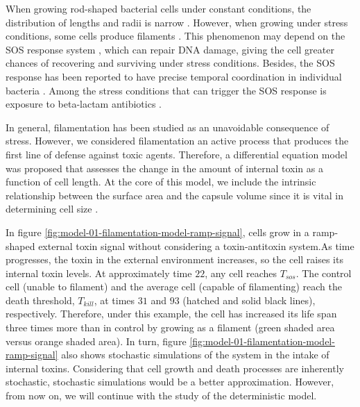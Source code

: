 \documentclass[
  12pt,
  a4paper,
  oneside]{krantz}
\begin{document}
When growing rod-shaped bacterial cells under constant conditions, the
distribution of lengths and radii is narrow
\citep{schaechterGrowthCellNuclear1962}. However, when growing under stress
conditions, some cells produce filaments
\citep{schaechterDependencyMediumTemperature1958}. This phenomenon may depend
on the SOS response system \citep{bosEmergenceAntibioticResistance2015},
which can repair DNA damage, giving the cell greater chances of
recovering and surviving under stress conditions. Besides, the SOS
response has been reported to have precise temporal coordination in
individual bacteria \citep{friedmanPreciseTemporalModulation2005}. Among the
stress conditions that can trigger the SOS response is exposure to
beta-lactam antibiotics \citep{millerSOSResponseInduction2004}.

In general, filamentation has been studied as an unavoidable consequence
of stress. However, we considered filamentation an active process that
produces the first line of defense against toxic agents. Therefore, a
differential equation model was proposed that assesses the change in the
amount of internal toxin as a function of cell length. At the core of
this model, we include the intrinsic relationship between the surface
area and the capsule volume since it is vital in determining cell size
\citep{harrisRelativeRatesSurface2016}.

In figure \ref{fig:model-01-filamentation-model-ramp-signal}, cells
grow in a ramp-shaped external toxin signal without considering a
toxin-antitoxin system.As time progresses, the toxin in the external
environment increases, so the cell raises its internal toxin levels. At
approximately time \(22\), any cell reaches \(T_{sos}\). The control cell
(unable to filament) and the average cell (capable of filamenting) reach
the death threshold, \(T_{kill}\), at times \(31\) and \(93\) (hatched and
solid black lines), respectively. Therefore, under this example, the
cell has increased its life span three times more than in control by
growing as a filament (green shaded area versus orange shaded area). In
turn, figure \ref{fig:model-01-filamentation-model-ramp-signal} also
shows stochastic simulations of the system in the intake of internal
toxins. Considering that cell growth and death processes are inherently
stochastic, stochastic simulations would be a better approximation.
However, from now on, we will continue with the study of the
deterministic model.
\end{document}
